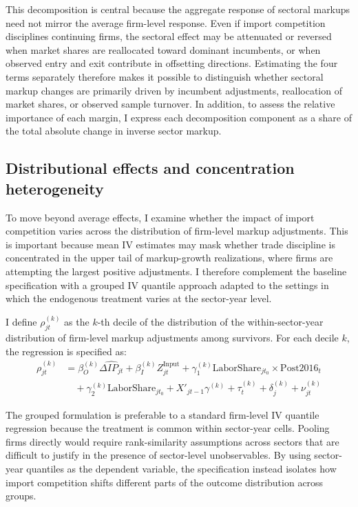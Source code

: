 ﻿\documentclass[12pt]{article}
\begin{document}
This decomposition is central because the aggregate response of sectoral markups need not mirror the average firm-level response. Even if import competition disciplines continuing firms, the sectoral effect may be attenuated or reversed when market shares are reallocated toward dominant incumbents, or when observed entry and exit contribute in offsetting directions. Estimating the four terms separately therefore makes it possible to distinguish whether sectoral markup changes are primarily driven by incumbent adjustments, reallocation of market shares, or observed sample turnover. In addition, to assess the relative importance of each margin, I express each decomposition component as a share of the total absolute change in inverse sector markup. 

\subsection{Distributional effects and concentration heterogeneity}
\label{sec:distributional}

To move beyond average effects, I examine whether the impact of import competition varies across the distribution of firm-level markup adjustments. This is important because mean IV estimates may mask whether trade discipline is concentrated in the upper tail of markup-growth realizations, where firms are attempting the largest positive adjustments. I therefore complement the baseline specification with a grouped IV quantile approach \textcite{chetverikovIVQuantileRegression2016} adapted to the settings in which the endogenous treatment varies at the sector-year level. 

I define $\rho_{jt}^{(k)}$ as the $k$-th decile of the distribution of the within-sector-year distribution of firm-level markup adjustments among survivors. For each decile $k$, the regression is specified as:
\begin{equation}
\begin{aligned}
\rho_{jt}^{(k)} &= \beta_O^{(k)} \widehat{\Delta IP_{jt}} + \beta_I^{(k)} Z_{jt}^{\text{Input}} + \gamma_1^{(k)} \text{LaborShare}_{jt_0} \times \text{Post2016}_t \\
&\quad + \gamma_2^{(k)} \text{LaborShare}_{jt_0} + X'_{jt-1} \gamma^{(k)} + \tau_t^{(k)} + \delta_j^{(k)} + \nu_{jt}^{(k)}
\end{aligned}
\end{equation}

The grouped formulation is preferable to a standard firm-level IV quantile regression because the treatment is common within sector-year cells. Pooling firms directly would require rank-similarity assumptions across sectors that are difficult to justify in the presence of sector-level unobservables. By using sector-year quantiles as the dependent variable, the specification instead isolates how import competition shifts different parts of the outcome distribution across groups. 
\end{document}
